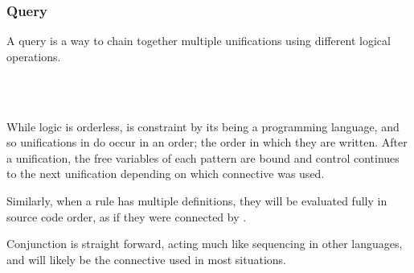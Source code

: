 \subsubsection{Query}

A query is a way to chain together multiple unifications using different
logical operations.

\begin{bnf*}
     \\
     \\
\end{bnf*}

While logic is orderless, \Law{} is constraint by its being a programming language,
and so unifications in \Law{} do occur in an order; the order in which they are
written. After a unification, the free variables of each pattern are bound and
control continues to the next unification depending on which connective was used.

Similarly, when a rule has multiple definitions, they will be evaluated fully in
source code order, as if they were connected by .

\begin{prooftree}
\end{prooftree}

Conjunction is straight forward, acting much like sequencing in other languages,
and will likely be the connective used in most situations.

\begin{center}
    \parbox[t]{0.45\linewidth}{
    \begin{prooftree}
    \end{prooftree}
    }
    \quad
    \parbox[t]{0.45\linewidth}{
    \begin{prooftree}
    \end{prooftree}
}
\end{center}

